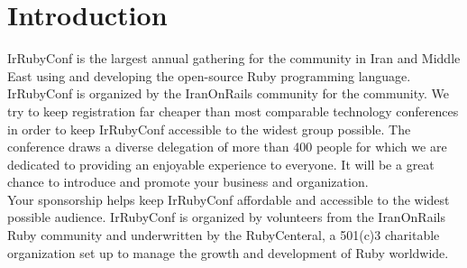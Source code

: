 \documentclass[a4paper,12pt]{article}
\newcommand{\Title}{IrRubyConf 2015}
\newcommand{\SubTitle}{Sponsorship proposal}
\begin{document}

\newpage


\section*{Introduction}
IrRubyConf is the largest annual gathering for the community in Iran and Middle East using and developing the open-source Ruby programming language. IrRubyConf is organized by the IranOnRails community for the community. We try to keep registration far cheaper than most comparable technology conferences in order to keep IrRubyConf accessible to the widest group possible. The conference draws a diverse delegation of more than 400 people for which we are dedicated to providing an enjoyable experience to everyone. It will be a great chance to introduce and promote your business and organization.
\\
Your sponsorship helps keep IrRubyConf affordable and accessible to the widest possible audience. IrRubyConf is organized by volunteers from the IranOnRails Ruby community and underwritten by the RubyCenteral, a 501(c)3 charitable organization set up to manage the growth and development of Ruby worldwide.
\end{document}
